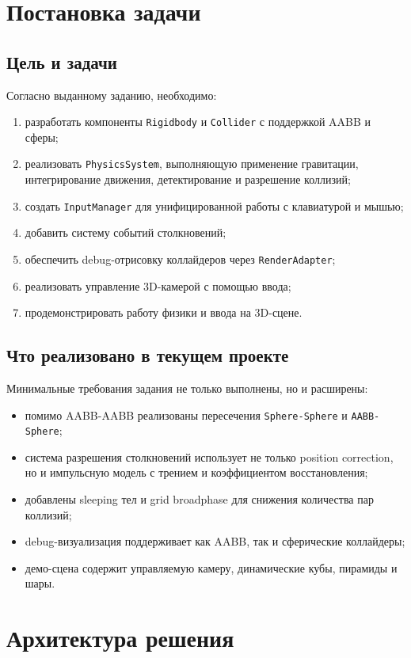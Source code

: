\documentclass[a4paper,14pt]{extarticle}
\begin{document}
\section{Постановка задачи}
\subsection{Цель и задачи}
Согласно выданному заданию, необходимо:
\begin{enumerate}
  \item разработать компоненты \texttt{Rigidbody} и \texttt{Collider} с поддержкой AABB и сферы;
  \item реализовать \texttt{PhysicsSystem}, выполняющую применение гравитации, интегрирование движения, детектирование и разрешение коллизий;
  \item создать \texttt{InputManager} для унифицированной работы с клавиатурой и мышью;
  \item добавить систему событий столкновений;
  \item обеспечить debug-отрисовку коллайдеров через \texttt{RenderAdapter};
  \item реализовать управление 3D-камерой с помощью ввода;
  \item продемонстрировать работу физики и ввода на 3D-сцене.
\end{enumerate}

\subsection{Что реализовано в текущем проекте}
Минимальные требования задания не только выполнены, но и расширены:
\begin{itemize}
  \item помимо AABB-AABB реализованы пересечения \texttt{Sphere-Sphere} и \texttt{AABB-Sphere};
  \item система разрешения столкновений использует не только position correction, но и импульсную модель с трением и коэффициентом восстановления;
  \item добавлены sleeping тел и grid broadphase для снижения количества пар коллизий;
  \item debug-визуализация поддерживает как AABB, так и сферические коллайдеры;
  \item демо-сцена содержит управляемую камеру, динамические кубы, пирамиды и шары.
\end{itemize}

\section{Архитектура решения}
\end{document}
